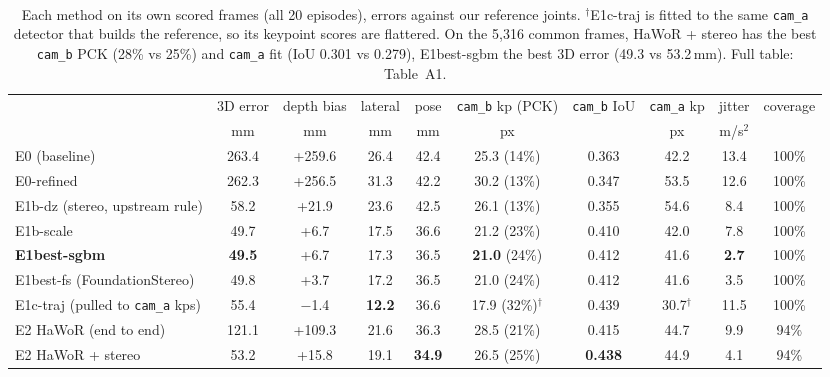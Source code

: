 \documentclass[10pt]{article}
\newcommand{\sect}[1]{\vspace{3pt}{\large\bfseries #1}\par\vspace{1pt}}
\begin{document}
\begin{table}[H]\small\centering
\begin{minipage}{\linewidth}\raggedright\sect{3. Results on Track 3}\end{minipage}\\[2pt]
\setlength{\tabcolsep}{3.9pt}
\begin{tabular}{@{}lccccccccc@{}}
\toprule
& 3D error & depth bias & lateral & pose & \texttt{cam\_b} kp (PCK) & \texttt{cam\_b} IoU & \texttt{cam\_a} kp & jitter & coverage \\
& mm & mm & mm & mm & px & & px & m/s$^2$ & \\
\midrule
E0 (baseline) & 263.4 & +259.6 & 26.4 & 42.4 & 25.3 (14\%) & 0.363 & 42.2 & 13.4 & 100\% \\
E0-refined & 262.3 & +256.5 & 31.3 & 42.2 & 30.2 (13\%) & 0.347 & 53.5 & 12.6 & 100\% \\
E1b-dz (stereo, upstream rule) & 58.2 & +21.9 & 23.6 & 42.5 & 26.1 (13\%) & 0.355 & 54.6 & 8.4 & 100\% \\
E1b-scale & 49.7 & +6.7 & 17.5 & 36.6 & 21.2 (23\%) & 0.410 & 42.0 & 7.8 & 100\% \\
\textbf{E1best-sgbm} & \textbf{49.5} & +6.7 & 17.3 & 36.5 & \textbf{21.0} (24\%) & 0.412 & 41.6 & \textbf{2.7} & 100\% \\
E1best-fs (FoundationStereo) & 49.8 & +3.7 & 17.2 & 36.5 & 21.0 (24\%) & 0.412 & 41.6 & 3.5 & 100\% \\
E1c-traj (pulled to \texttt{cam\_a} kps) & 55.4 & $-$1.4 & \textbf{12.2} & 36.6 & 17.9 (32\%)$^\dagger$ & 0.439 & 30.7$^\dagger$ & 11.5 & 100\% \\
E2 HaWoR (end to end) & 121.1 & +109.3 & 21.6 & 36.3 & 28.5 (21\%) & 0.415 & 44.7 & 9.9 & 94\% \\
E2 HaWoR + stereo & 53.2 & +15.8 & 19.1 & \textbf{34.9} & 26.5 (25\%) & \textbf{0.438} & 44.9 & 4.1 & 94\% \\
\bottomrule
\end{tabular}
\caption*{Each method on its own scored frames (all 20 episodes), errors against our reference joints. $^\dagger$E1c-traj
is fitted to the same \texttt{cam\_a} detector that builds the reference, so its keypoint scores are flattered. On the
5{,}316 common frames, HaWoR + stereo has the best \texttt{cam\_b} PCK (28\% vs 25\%) and \texttt{cam\_a} fit (IoU
0.301 vs 0.279), E1best-sgbm the best 3D error (49.3 vs 53.2\,mm). Full table: Table~A1.}
\end{table}
\vspace{-6pt}
\end{document}
